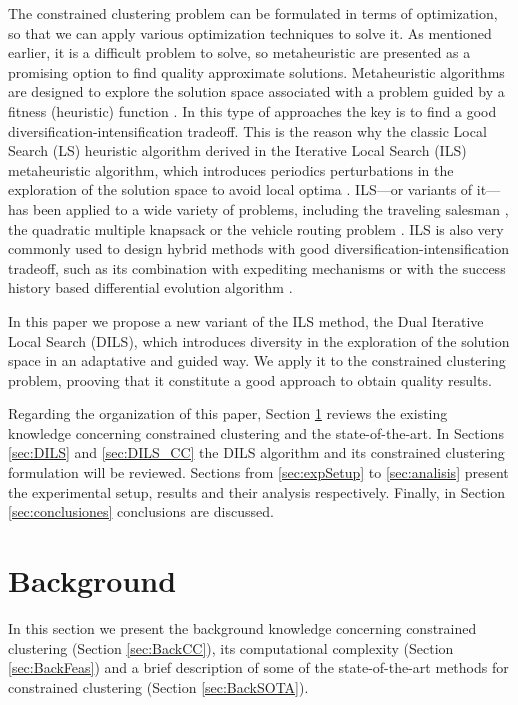 \documentclass[review]{elsarticle}
\begin{document}
The constrained clustering problem can be formulated in terms of optimization, so that we can apply various optimization techniques to solve it. As mentioned earlier, it is a difficult problem to solve, so metaheuristic are presented as a promising option to find quality approximate solutions. Metaheuristic algorithms are designed to explore the solution space associated with a problem guided by a fitness (heuristic) function \cite{Gendreau:2010:HM:1941310}. In this type of approaches the key is to find a good diversification-intensification tradeoff. This is the reason why the classic Local Search (LS) heuristic algorithm derived in the Iterative Local Search (ILS) metaheuristic algorithm, which introduces periodics perturbations in the exploration of the solution space to avoid local optima \cite{lourencco2010iterated}. ILS---or variants of it---has been applied to a wide variety of problems, including the traveling salesman \cite{archetti2018iterated}, the quadratic multiple knapsack \cite{avci2017multi} or the vehicle routing problem \cite{chentli2018impact, estrada2019biased}. ILS is also very commonly used to design hybrid methods with good diversification-intensification tradeoff, such as its combination with expediting mechanisms \cite{zohali2019reformulation} or with the success history based differential evolution algorithm \cite{zhao2019hybrid}.

In this paper we propose a new variant of the ILS method, the Dual Iterative Local Search (DILS), which introduces diversity in the exploration of the solution space in an adaptative and guided way. We apply it to the constrained clustering problem, prooving that it constitute a good approach to obtain quality results.

Regarding the organization of this paper, Section \ref{sec:background} reviews the existing knowledge concerning constrained clustering and the state-of-the-art. In Sections \ref{sec:DILS} and \ref{sec:DILS_CC} the DILS algorithm and its constrained clustering formulation will be reviewed. Sections from \ref{sec:expSetup} to \ref{sec:analisis} present the experimental setup, results and their analysis respectively. Finally, in Section \ref{sec:conclusiones} conclusions are discussed.

\section{Background} \label{sec:background}

In this section we present the background knowledge concerning constrained clustering (Section \ref{sec:BackCC}), its computational complexity (Section \ref{sec:BackFeas}) and a brief description of some of the state-of-the-art methods for constrained clustering (Section \ref{sec:BackSOTA}).
\end{document}
